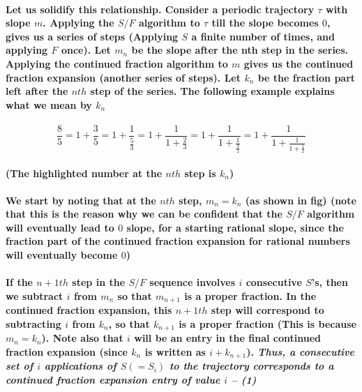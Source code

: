 \documentclass{report}
\begin{document}
\paragraph{Let us solidify this relationship. Consider a periodic trajectory $\tau$  with slope $m$. Applying the $S/F$ algorithm to $\tau$ till the slope becomes $0$, gives us a series of steps (Applying $S$ a finite number of times, and applying $F$ once). Let $m_n$ be the slope after the nth step in the series. Applying the continued fraction algorithm to $m$ gives us the continued fraction expansion (another series of steps). Let $k_n$ be the fraction part left after the $nth$ step of the series. The following example explains what we mean by $k_n$ }

\begin{equation}
\frac{8}{5}=1+\frac{3}{5}=1+\frac{1}{\frac{5}{3}}=1+\frac{1}{1+\frac{2}{3}}=1+\frac{1}{1+\frac{1}{\frac{3}{2}}}=1+\frac{1}{1+\frac{1}{1+\frac{1}{2}}}
\end{equation}

\paragraph{(The highlighted number at the $nth$ step is $k_n$)}

\paragraph{We start by noting that at the $nth$ step, $m_n = k_n$ (as shown in fig) (note that this is the reason why we can be confident that the $S/F$ algorithm will eventually lead to $0$ slope, for a starting rational slope, since the fraction part of the continued fraction expansion for rational numbers will eventually become $0$)}

\paragraph{If the $n+1th$ step in the $S/F$ sequence involves $i$ consecutive $S$’s, then we subtract $i$ from $m_n$ so that $m_{n+1}$ is a proper fraction. In the continued fraction expansion, this $n+1th$ step will correspond to subtracting $i$ from $k_n$, so that $k_{n+1}$ is a proper fraction (This is because $m_n = k_n$). Note also that $i$ will be an entry in the final continued fraction expansion (since $k_n$ is written as $i + k_{n+1}$). \textit{Thus, a consecutive set of $i$ applications of $S (= S_i)$ to the trajectory corresponds to a continued fraction expansion entry of value $i$ -- (1)}}
\end{document}
